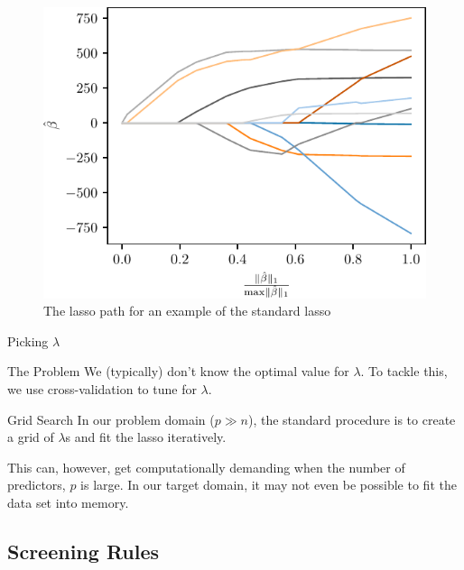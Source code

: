 \documentclass[10pt,ignorenonframetext]{beamer}
\begin{document}
\begin{frame}
  \begin{figure}
    \includegraphics{figures/lasso-path}
    \caption{The lasso path for an example of the standard lasso}
  \end{figure}
\end{frame}

\begin{frame}{Picking \(\lambda\)}

  \begin{block}{The Problem}
    We (typically) don't know the optimal value for
    \(\lambda\). To tackle this, we use cross-validation to tune for
    \(\lambda\).
  \end{block}

  \pause

  \medskip

  \begin{block}{Grid Search}
    In our problem domain (\(p \gg n\)), the standard procedure is to create a
    grid of \(\lambda\)s and fit the lasso iteratively.
  \end{block}

  \medskip

  \pause

  This can, however, get computationally demanding when the number of
  predictors, \(p\) is large. In our target domain, it may not even be possible
  to fit the data set into memory.

\end{frame}

\subsection{Screening Rules}
\end{document}
